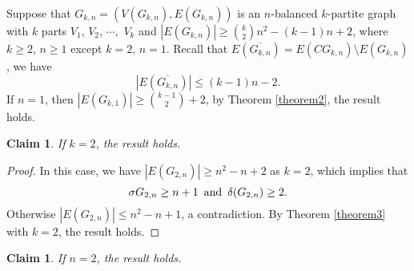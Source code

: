 \documentclass[reqno]{amsart}
\newtheorem{claim}[theorem]{Claim}
\begin{document}
Suppose that  $G_{k,n}=(V(G_{k,n}),E(G_{k,n}))$ is an $n$-balanced $k$-partite graph with $k$ parts  $V_1$, $V_2$, $\cdots,$ $V_k$ and  $|E(G_{k,n})| \geq \binom{k}{2}n^{2}-(k-1) n+2 $, where $k \geq 2$,  $n \geq 1$ except $k=2$, $n=1$. Recall that $E(\overline{G_{k,n}})=E(CG_{k,n})\setminus E(G_{k,n})$,  we have
\begin{equation}\label{eq111}
 |E(\overline{G_{k,n}})| \leq(k-1) n-2.
\end{equation}
If $n=1$, then $|E(G_{k,1})| \geq \binom{k-1}{2}+2$, by Theorem \ref{theorem2}, the result holds.

\begin{claim} If $k=2$, the result holds.
\end{claim}
\begin{proof} In this case, we have $|E(G_{2,n})| \geq n^2-n+2$ as $k=2$, which implies that
\begin{equation}\label{eq222}
\sigma {G_{2,n}} \geq n+1 \text{\, and\, } \delta (G_{2,n}) \geq 2.
\end{equation}
Otherwise $|E(G_{2,n})| \leq  n^2-n+1$, a contradiction.
By Theorem \ref{theorem3} with $k=2$, the result holds.
\end{proof}
\begin{claim}\label{claim88} If $n=2$, the result holds.
\end{claim}
\end{document}
